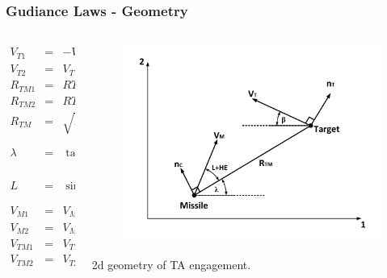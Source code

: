 \documentclass{beamer}
\begin{document}
\begin{frame}
\frametitle{Gudiance Laws - Geometry}
\begin{columns}[c]
	\begin{column}{.35\linewidth}
{\footnotesize 		\begin{eqnarray}
		V_{T1} &=& - V_T \cos(\beta) \nonumber\\
		V_{T2} &=&  V_T \sin(\beta) \nonumber\\
		R_{TM1} &=& R{T1} - R_{M1}\nonumber\\
		R_{TM2} &=& R{T2} - R_{M2}\nonumber\\
		R_{TM} &=& \sqrt{R_{TM1}^2 + R_{TM2}^2}\nonumber\\
		\lambda &=& \tan^{-1} (\dfrac{R_{TM2}}{R_{TM1}})\nonumber\\
		L &=& \sin^{-1}(\dfrac{V_T \sin(\beta + \lambda)}{V_M})\nonumber\\
		V_{M1} &=& V_M \cos (\theta + HE)\nonumber\\
		V_{M2} &=& V_M \sin (\theta + HE)\nonumber\\
		V_{TM1} &=& V_{T1} - V_{M1}\nonumber\\
		V_{TM2} &=& V_{T2} - V_{M12}\nonumber
		\end{eqnarray}}
	\end{column}
	\begin{column}{.6\linewidth}
		\begin{figure}[htb]
			\centering
			\includegraphics[scale = 0.25]{fig/PN.pdf}
			\label{PN}
		\end{figure}
	2d geometry of TA engagement.
	\end{column}
\end{columns}
\end{frame}
\end{document}
